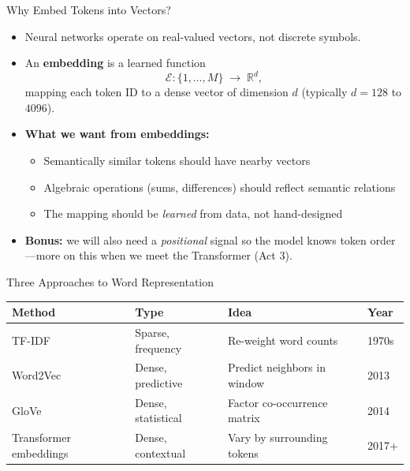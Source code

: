 \begin{frame}{Why Embed Tokens into Vectors?}
\begin{itemize}
\item Neural networks operate on real-valued vectors, not discrete symbols.

\medskip
\item An \textbf{embedding} is a learned function
\[
   \mathcal{E}\colon \{1, \ldots, M\} \;\longrightarrow\; \mathbb{R}^{d},
\]
mapping each token ID to a dense vector of dimension $d$ (typically $d=128$ to $4096$).

\medskip
\item \textbf{What we want from embeddings:}
\begin{itemize}
    \item Semantically similar tokens should have nearby vectors
    \item Algebraic operations (sums, differences) should reflect semantic relations
    \item The mapping should be \emph{learned} from data, not hand-designed
\end{itemize}

\medskip
\item \textbf{Bonus:} we will also need a \emph{positional} signal so the model knows token order---more on this when we meet the Transformer (Act 3).
\end{itemize}
\end{frame}

\begin{frame}{Three Approaches to Word Representation}
\begin{center}
\renewcommand{\arraystretch}{1.3}
\begin{tabular}{l l l l}
\toprule
\textbf{Method} & \textbf{Type} & \textbf{Idea} & \textbf{Year} \\
\midrule
TF-IDF & Sparse, frequency & Re-weight word counts & 1970s \\
Word2Vec & Dense, predictive & Predict neighbors in window & 2013 \\
GloVe & Dense, statistical & Factor co-occurrence matrix & 2014 \\
Transformer embeddings & Dense, contextual & Vary by surrounding tokens & 2017+ \\
\bottomrule
\end{tabular}
\end{center}
\end{frame}

